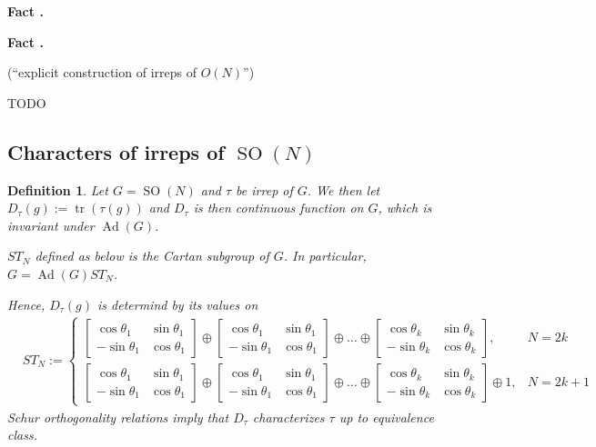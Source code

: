\documentclass{article}
\newcommand{\assign}{:=}
\newcommand{\tmop}[1]{\ensuremath{\operatorname{#1}}}
\newcommand{\tmtextbf}[1]{{\bfseries{#1}}}
\newcommand{\tmtextit}[1]{{\itshape{#1}}}
\newcommand{\tmtextup}[1]{{\upshape{#1}}}
\newtheorem{definition}{Definition}
\begin{document}
{\noindent}\tmtextbf{Fact \tmtextup{4}.
}\tmtextit{{\cite{fulton2013representation}}}{\hspace*{\fill}}{\medskip}

{\noindent}\tmtextbf{Fact \tmtextup{5}. }\tmtextit{{\cite[Sec 10.2.4,
10.2.5]{goodman2000representations}} (``explicit construction of irreps of $O
(N)$'')

TODO}{\hspace*{\fill}}{\medskip}

\subsection{Characters of irreps of $\tmop{SO} (N)$}{}

\begin{definition}
  Let $G = \tmop{SO} (N)$ and $\tau$ be irrep of $G$. We then let $D_{\tau}
  (g) \assign \tmop{tr} (\tau (g))$ and $D_{\tau}$ is then continuous function
  on $G$, which is invariant under $\tmop{Ad} (G)$.
  
  $S T_N$ defined as below is the Cartan subgroup of $G$. In particular, $G =
  \tmop{Ad} (G) S T_N$.
  
  Hence, $D_{\tau} (g)$ is determind by its values on
  \begin{eqnarray}
    & S T_N \assign \left\{ \begin{array}{ll}
      \left[ \begin{array}{ll}
        \cos \theta_1 & \sin \theta_1\\
        - \sin \theta_1 & \cos \theta_1
      \end{array} \right] \oplus \left[ \begin{array}{ll}
        \cos \theta_1 & \sin \theta_1\\
        - \sin \theta_1 & \cos \theta_1
      \end{array} \right] \oplus \ldots \oplus \left[ \begin{array}{ll}
        \cos \theta_k & \sin \theta_k\\
        - \sin \theta_k & \cos \theta_k
      \end{array} \right], & N = 2 k\\
      \left[ \begin{array}{ll}
        \cos \theta_1 & \sin \theta_1\\
        - \sin \theta_1 & \cos \theta_1
      \end{array} \right] \oplus \left[ \begin{array}{ll}
        \cos \theta_1 & \sin \theta_1\\
        - \sin \theta_1 & \cos \theta_1
      \end{array} \right] \oplus \ldots \oplus \left[ \begin{array}{ll}
        \cos \theta_k & \sin \theta_k\\
        - \sin \theta_k & \cos \theta_k
      \end{array} \right] \oplus 1, & N = 2 k + 1
    \end{array} \right. &  \nonumber
  \end{eqnarray}
  Schur orthogonality relations imply that $D_{\tau}$ characterizes $\tau$ up
  to equivalence class.
\end{definition}
\end{document}
